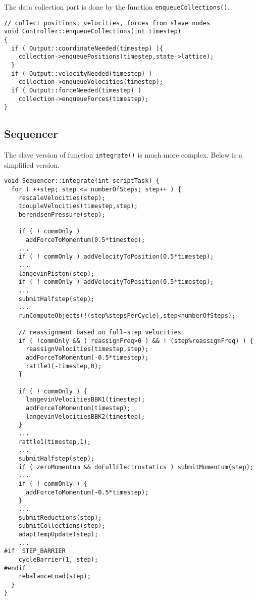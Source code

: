 \documentclass{article}
\begin{document}
The data collection part is done by the function
\texttt{enqueueCollections()}.

\begin{lstlisting}
// collect positions, velocities, forces from slave nodes
void Controller::enqueueCollections(int timestep)
{
  if ( Output::coordinateNeeded(timestep) ){
    collection->enqueuePositions(timestep,state->lattice);
  }
  if ( Output::velocityNeeded(timestep) )
    collection->enqueueVelocities(timestep);
  if ( Output::forceNeeded(timestep) )
    collection->enqueueForces(timestep);
}
\end{lstlisting}


\subsection{Sequencer}

The slave version of function \texttt{integrate()}
is much more complex.  Below is a simplified version.

\begin{lstlisting}
void Sequencer::integrate(int scriptTask) {
  for ( ++step; step <= numberOfSteps; step++ ) {
    rescaleVelocities(step);
    tcoupleVelocities(timestep,step);
    berendsenPressure(step);

    if ( ! commOnly )
      addForceToMomentum(0.5*timestep);
    ...
    if ( ! commOnly ) addVelocityToPosition(0.5*timestep);
    ...
    langevinPiston(step);
    if ( ! commOnly ) addVelocityToPosition(0.5*timestep);
    ...
    submitHalfstep(step);
    ...
    runComputeObjects(!(step%stepsPerCycle),step<numberOfSteps);

    // reassignment based on full-step velocities
    if ( !commOnly && ( reassignFreq>0 ) && ! (step%reassignFreq) ) {
      reassignVelocities(timestep,step);
      addForceToMomentum(-0.5*timestep);
      rattle1(-timestep,0);
    }

    if ( ! commOnly ) {
      langevinVelocitiesBBK1(timestep);
      addForceToMomentum(timestep);
      langevinVelocitiesBBK2(timestep);
    }
    ...
    rattle1(timestep,1);
    ...
    submitHalfstep(step);
    if ( zeroMomentum && doFullElectrostatics ) submitMomentum(step);
    ...
    if ( ! commOnly ) {
      addForceToMomentum(-0.5*timestep);
    }
    ...
    submitReductions(step);
    submitCollections(step);
    adaptTempUpdate(step);
    ...
#if  STEP_BARRIER
    cycleBarrier(1, step);
#endif
    rebalanceLoad(step);
  }
}
\end{lstlisting}
\end{document}
